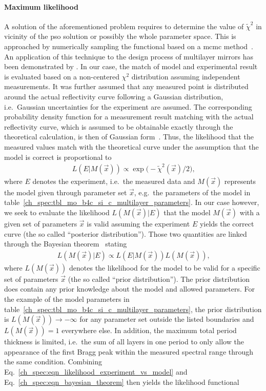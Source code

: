 \paragraph{Maximum likelihood}
A solution of the aforementioned problem requires to determine the value of $\tilde{\chi}^2$ in vicinity of the \gls{pso} solution or possibly the whole parameter space. This is approached by numerically sampling the functional based on a \gls{mcmc} method~\cite{goodman_ensemble_2010}. An application of this technique to the design process of multilayer mirrors has been demonstrated by \textcite{hobson_markov-chain_2004}. In our case, the match of model and experimental result is evaluated based on a non-centered $\chi^2$ distribution assuming independent measurements. It was further assumed that any measured point is distributed around the actual reflectivity curve following a Gaussian distribution, i.e.~Gaussian uncertainties for the experiment are assumed. The corresponding probability density function for a measurement result matching with the actual reflectivity curve, which is assumed to be obtainable exactly through the theoretical calculation, is then of Gaussian form~\cite{abramowitz_handbook_1964}. Thus, the likelihood that the measured values match with the theoretical curve under the assumption that the model is correct is proportional to
\begin{align}
 L(E | M(\vec{x})) \propto \exp \big(- \tilde{\chi}^2(\vec{x}) / 2 \big) \text{,} \label{ch_spec:eqn_likelihood_experiment_vs_model}
\end{align}
where $E$ denotes the experiment, i.e.~the measured data and $M(\vec{x})$ represents the model given through parameter set $\vec{x}$, e.g.~the parameters of the model in table~\ref{ch_spec:tbl_mo_b4c_si_c_multilayer_parameters}. In our case however, we seek to evaluate the likelihood $L(M(\vec{x}) | E)$ that the model $M(\vec{x})$ with a given set of parameters $\vec{x}$ is valid assuming the experiment $E$ yields the correct curve (the so called ``posterior distribution''). Those two quantities are linked through the Bayesian theorem~\cite{bayes_essay_1763, milton_introduction_2002} stating
\begin{align}
 L(M(\vec{x}) | E) \propto L(E | M(\vec{x})) L(M(\vec{x})) \text{,} \label{ch_spec:eqn_bayesian_theorem}
\end{align}
where $L(M(\vec{x}))$ denotes the likelihood for the model to be valid for a specific set of parameters $\vec{x}$ (the so called ``prior distribution''). The prior distribution does contain any prior knowledge about the model and allowed parameters. For the example of the model parameters in table~\ref{ch_spec:tbl_mo_b4c_si_c_multilayer_parameters}, the prior distribution is $L(M(\vec{x})) \rightarrow -\infty$ for any parameter set outside the listed boundaries and $L(M(\vec{x})) = 1$ everywhere else. In addition, the maximum total period thickness is limited, i.e.~the sum of all layers in one period to only allow the appearance of the first Bragg peak within the measured spectral range through the same condition. Combining Eq.~\eqref{ch_spec:eqn_likelihood_experiment_vs_model} and Eq.~\eqref{ch_spec:eqn_bayesian_theorem} then yields the likelihood functional
